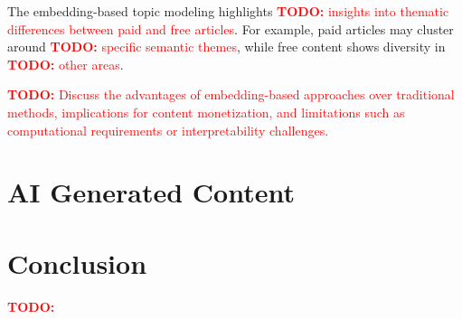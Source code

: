 \documentclass[11pt,a4paper]{article}
\newcommand{\todo}[1]{\textcolor{red}{\textbf{TODO:} #1}}
\begin{document}
The embedding-based topic modeling highlights \todo{insights into thematic differences between paid and free articles}. For example, paid articles may cluster around \todo{specific semantic themes}, while free content shows diversity in \todo{other areas}.

\todo{Discuss the advantages of embedding-based approaches over traditional methods, implications for content monetization, and limitations such as computational requirements or interpretability challenges.}


\section{AI Generated Content}


\section{Conclusion}

\todo{}
\end{document}
